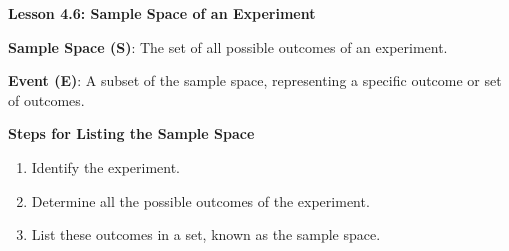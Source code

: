  \begin{center}
\textbf{Lesson 4.6: Sample Space of an Experiment}
\end{center}

\vspace*{1ex}

    \noindent \textbf{Sample Space (S)}: The set of all possible outcomes of an experiment.
    
    \noindent \textbf{Event (E)}: A subset of the sample space, representing a specific outcome or set of outcomes.


\noindent\textbf{Steps for Listing the Sample Space}
\begin{enumerate}
    \item Identify the experiment.
    \item Determine all the possible outcomes of the experiment.
    \item List these outcomes in a set, known as the sample space.
\end{enumerate}


